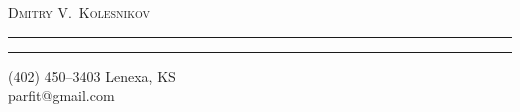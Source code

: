 \pagestyle{fancy}
\renewcommand{\headrulewidth}{0pt}
\setlength{\parindent}{0in}

\begin{center}
\begin{LARGE}
\textsc{Dmitry V.\ Kolesnikov}
\end{LARGE}
\end{center}
\vspace{-0.5mm}
\hrule
\vspace{0.3mm}
\hrule
\vspace{3mm}
\begin{small}\textnormal{\Telefon\hspace{1mm}(402) 450--3403} \hfill \textnormal{Lenexa, KS}\\ %
\textnormal{\Letter\hspace{0.8mm}parfit@gmail.com}\end{small}
\vspace{4mm}